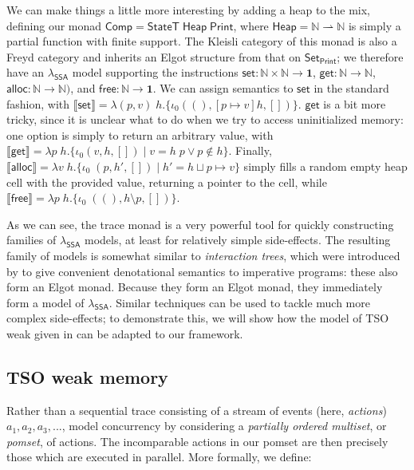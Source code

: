 \documentclass[acmsmall,screen,review]{acmart}
\newcommand{\mb}[1]{\ensuremath{\mathbf{#1}}}
\newcommand{\ms}[1]{\ensuremath{\mathsf{#1}}}
\newcommand{\nats}{\mathbb{N}}
\newcommand{\dnt}[1]{\llbracket{#1}\rrbracket}
\newcommand{\isotopessa}{\(\lambda_{\ms{SSA}}\)}
\begin{document}
We can make things a little more interesting by adding a heap to the mix, defining our monad
\(\ms{Comp} = \ms{StateT}\;\ms{Heap}\;\ms{Print}\), where \(\ms{Heap} = \nats \rightharpoonup
\nats\) is simply a partial function with finite support. The Kleisli category of this monad is also
a Freyd category and inherits an Elgot structure from that on \(\ms{Set}_{\ms{Print}}\); we
therefore have an \isotopessa{} model supporting the instructions \(\ms{set}: \nats \times \nats \to
\mb{1}\), \(\ms{get}: \nats \to \nats\), \(\ms{alloc}: \nats \to \nats)\), and \(\ms{free}: \nats
\to \mb{1}\). We can assign semantics to \(\ms{set}\) in the standard fashion, with \(\dnt{\ms{set}}
= \lambda (p, v)\;h. \{\iota_0((), [p \mapsto v]h, [])\}\). \(\ms{get}\) is a bit more tricky, since
it is unclear what to do when we try to access uninitialized memory: one option is simply to return
an arbitrary value, with \(\dnt{\ms{get}} = \lambda p\;h. \{\iota_0(v, h, []) \mid v = h\;p \lor p
\notin h\}\). Finally, \(\dnt{\ms{alloc}} = \lambda v\;h.\{\iota_0\;(p, h', []) \mid h' = h \sqcup p
\mapsto v\}\) simply fills a random empty heap cell with the provided value, returning a pointer to
the cell, while \(\dnt{\ms{free}} = \lambda p\;h. \{\iota_0\;((), h \setminus p, [])\}\).

As we can see, the trace monad is a very powerful tool for quickly constructing families of
\isotopessa{} models, at least for relatively simple side-effects. The resulting family of models is
somewhat similar to \emph{interaction trees}, which were introduced by \citet{xia-20-itrees} to give
convenient denotational semantics to imperative programs: these also form an Elgot monad. Because they
form an Elgot monad, they immediately form a model of \isotopessa{}. Similar techniques can be used
to tackle much more complex side-effects; to demonstrate this, we will show how the model of TSO weak
given in \citet{sparky} can be adapted to our framework.

\subsection{TSO weak memory}

\label{ssec:tso}

Rather than a sequential trace consisting of a stream of events (here, \emph{actions}) $a_1, a_2,
a_3, ...$, \citet{sparky} model concurrency by considering a \emph{partially ordered multiset}, or
\emph{pomset}, of actions. The incomparable actions in our pomset are then precisely those which are
executed in parallel. More formally, we define:
\end{document}
